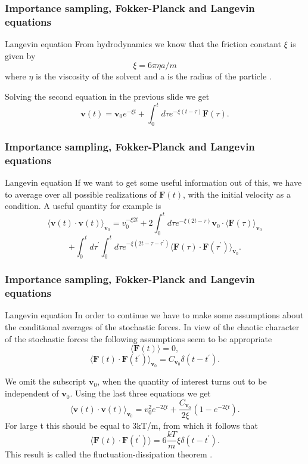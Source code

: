 \documentclass{beamer}
\begin{document}
\begin{frame}
\frametitle{Importance sampling, Fokker-Planck and Langevin equations}

\begin{block}{Langevin equation }
From hydrodynamics  we know that the friction constant  $\xi$ is given by
\[
\xi =6\pi \eta a/m 
\]
where $\eta$ is the viscosity  of the solvent and a is the radius of the particle .

Solving the second equation in the previous slide we get 
\[
\mathbf{v}(t)=\mathbf{v}_{0}e^{-\xi t}+\int_{0}^{t}d\tau e^{-\xi (t-\tau )}\mathbf{F }(\tau ). 
\]
\end{block}
\end{frame}

\begin{frame}
\frametitle{Importance sampling, Fokker-Planck and Langevin equations}

\begin{block}{Langevin equation }
If we want to get some useful information out of this, we have to average over all possible realizations of 
$\mathbf{F}(t)$, with the initial velocity as a condition. A useful quantity for example is
\[ 
\langle \mathbf{v}(t)\cdot \mathbf{v}(t)\rangle_{\mathbf{v}_{0}}=v_{0}^{-\xi 2t}
+2\int_{0}^{t}d\tau e^{-\xi (2t-\tau)}\mathbf{v}_{0}\cdot \langle \mathbf{F}(\tau )\rangle_{\mathbf{v}_{0}}
\]
\[  	  	
 +\int_{0}^{t}d\tau ^{\prime }\int_{0}^{t}d\tau e^{-\xi (2t-\tau -\tau ^{\prime })}
\langle \mathbf{F}(\tau )\cdot \mathbf{F}(\tau ^{\prime })\rangle_{ \mathbf{v}_{0}}.
\]
\end{block}
\end{frame}

\begin{frame}
\frametitle{Importance sampling, Fokker-Planck and Langevin equations}

\begin{block}{Langevin equation }
In order to continue we have to make some assumptions about the conditional averages of the stochastic forces. 
In view of the chaotic character of the stochastic forces the following assumptions seem to be appropriate
\[ 
\langle \mathbf{F}(t)\rangle=0, 
\]
\[
\langle \mathbf{F}(t)\cdot \mathbf{F}(t^{\prime })\rangle_{\mathbf{v}_{0}}=  C_{\mathbf{v}_{0}}\delta (t-t^{\prime }).
\] 	

We omit the subscript $\mathbf{v}_{0}$, when the quantity of interest turns out to be independent of $\mathbf{v}_{0}$. Using the last three equations we get
 \[
\langle \mathbf{v}(t)\cdot \mathbf{v}(t)\rangle_{\mathbf{v}_{0}}=v_{0}^{2}e^{-2\xi t}+\frac{C_{\mathbf{v}_{0}}}{2\xi }(1-e^{-2\xi t}).
\]
For large t this should be equal to 3kT/m, from which it follows that
\[
\langle \mathbf{F}(t)\cdot \mathbf{F}(t^{\prime })\rangle =6\frac{kT}{m}\xi \delta (t-t^{\prime }). 
\]
This result is called the fluctuation-dissipation theorem .
\end{block}
\end{frame}
\end{document}
